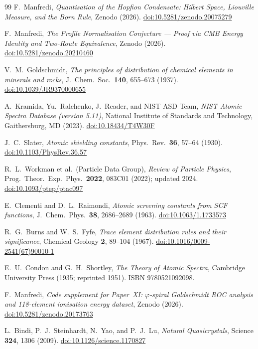 \documentclass[11pt,a4paper]{article}
\theoremstyle{definition}
\theoremstyle{remark}
\newcommand{\vp}{\varphi}
\begin{document}
\begin{thebibliography}{99}
F.~Manfredi,
\textit{Quantisation of the Hopfion Condensate: Hilbert Space, Liouville Measure, and the Born Rule},
Zenodo (2026).
\href{https://doi.org/10.5281/zenodo.20075279}{doi:10.5281/zenodo.20075279}

F.~Manfredi,
\textit{The Profile Normalisation Conjecture ---
  Proof via CMB Energy Identity and Two-Route Equivalence},
Zenodo (2026).
\href{https://doi.org/10.5281/zenodo.20210460}{doi:10.5281/zenodo.20210460}

V.~M.~Goldschmidt,
\textit{The principles of distribution of chemical elements in
  minerals and rocks},
J.~Chem.\ Soc.\ \textbf{140}, 655--673 (1937).
\href{https://doi.org/10.1039/JR9370000655}{doi:10.1039/JR9370000655}

A.~Kramida, Yu.~Ralchenko, J.~Reader, and NIST ASD Team,
\textit{NIST Atomic Spectra Database (version 5.11)},
National Institute of Standards and Technology, Gaithersburg, MD (2023).
\href{https://doi.org/10.18434/T4W30F}{doi:10.18434/T4W30F}

J.~C.~Slater,
\textit{Atomic shielding constants},
Phys.\ Rev.\ \textbf{36}, 57--64 (1930).
\href{https://doi.org/10.1103/PhysRev.36.57}{doi:10.1103/PhysRev.36.57}

R.~L.~Workman et al.\ (Particle Data Group),
\textit{Review of Particle Physics},
Prog.\ Theor.\ Exp.\ Phys.\ \textbf{2022}, 083C01 (2022);
updated 2024.
\href{https://doi.org/10.1093/ptep/ptac097}{doi:10.1093/ptep/ptac097}

E.~Clementi and D.~L.~Raimondi,
\textit{Atomic screening constants from SCF functions},
J.~Chem.\ Phys.\ \textbf{38}, 2686--2689 (1963).
\href{https://doi.org/10.1063/1.1733573}{doi:10.1063/1.1733573}

R.~G.~Burns and W.~S.~Fyfe,
\textit{Trace element distribution rules and their significance},
Chemical Geology \textbf{2}, 89--104 (1967).
\href{https://doi.org/10.1016/0009-2541(67)90010-1}{doi:10.1016/0009-2541(67)90010-1}

E.~U.~Condon and G.~H.~Shortley,
\textit{The Theory of Atomic Spectra},
Cambridge University Press (1935; reprinted 1951).
ISBN 9780521092098.

F.~Manfredi,
\textit{Code supplement for Paper~XI: $\vp$-spiral Goldschmidt ROC analysis
  and 118-element ionisation energy dataset},
Zenodo (2026).
\href{https://doi.org/10.5281/zenodo.20173763}{doi:10.5281/zenodo.20173763}

L.~Bindi, P.~J.~Steinhardt, N.~Yao, and P.~J.~Lu,
\textit{Natural Quasicrystals},
Science \textbf{324}, 1306 (2009).
\href{https://doi.org/10.1126/science.1170827}{doi:10.1126/science.1170827}

\end{thebibliography}
\end{document}
